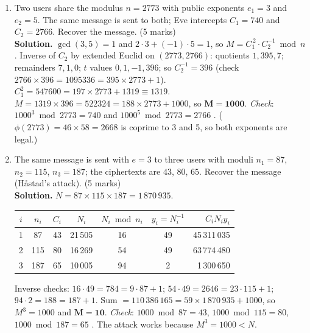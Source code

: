 \begin{enumerate}[leftmargin=1.6em,itemsep=4pt]
  \item Two users share the modulus $n = 2773$ with public exponents $e_1 = 3$ and $e_2 = 5$. The same message is sent to both; Eve intercepts $C_1 = 740$ and $C_2 = 2766$. Recover the message. \hfill(5 marks)\\
  \textbf{Solution.} $\gcd(3, 5) = 1$ and $2 \cdot 3 + (-1) \cdot 5 = 1$, so $M = C_1^{\,2} \cdot C_2^{-1} \bmod n$. Inverse of $C_2$ by extended Euclid on $(2773, 2766)$: quotients $1, 395, 7$; remainders $7, 1, 0$; $t$ values $0, 1, -1, 396$; so $C_2^{-1} = 396$ (check $2766 \times 396 = 1095336 = 395 \times 2773 + 1$). $C_1^2 = 547600 = 197 \times 2773 + 1319 \equiv 1319$. $M = 1319 \times 396 = 522324 = 188 \times 2773 + 1000$, so $\mathbf{M = 1000}$. \emph{Check}: $1000^3 \bmod 2773 = 740$ and $1000^5 \bmod 2773 = 2766$ \checkmark. ($\phi(2773) = 46 \times 58 = 2668$ is coprime to 3 and 5, so both exponents are legal.)

  \item The same message is sent with $e = 3$ to three users with moduli $n_1 = 87$, $n_2 = 115$, $n_3 = 187$; the ciphertexts are $43$, $80$, $65$. Recover the message (H\aa stad's attack). \hfill(5 marks)\\
  \textbf{Solution.} $N = 87 \times 115 \times 187 = 1\,870\,935$.
  \begin{center}\small
  \begin{tabular}{@{}ccccccr@{}}
  \toprule
  $i$ & $n_i$ & $C_i$ & $N_i$ & $N_i \bmod n_i$ & $y_i = N_i^{-1}$ & $C_i N_i y_i$\\
  \midrule
  1 & 87 & 43 & 21\,505 & 16 & 49 & 45\,311\,035\\
  2 & 115 & 80 & 16\,269 & 54 & 49 & 63\,774\,480\\
  3 & 187 & 65 & 10\,005 & 94 & 2 & 1\,300\,650\\
  \bottomrule
  \end{tabular}
  \end{center}
  Inverse checks: $16 \cdot 49 = 784 = 9 \cdot 87 + 1$; $54 \cdot 49 = 2646 = 23 \cdot 115 + 1$; $94 \cdot 2 = 188 = 187 + 1$. Sum $= 110\,386\,165 = 59 \times 1\,870\,935 + 1000$, so $M^3 = 1000$ and $\mathbf{M = 10}$. \emph{Check}: $1000 \bmod 87 = 43$, $1000 \bmod 115 = 80$, $1000 \bmod 187 = 65$ \checkmark. The attack works because $M^3 = 1000 < N$.


\end{enumerate}
